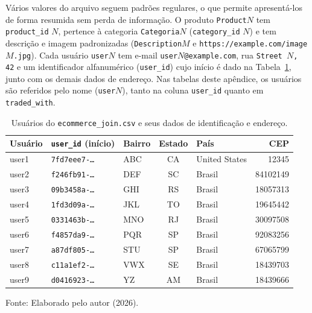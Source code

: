 Vários valores do arquivo seguem padrões regulares, o que permite apresentá-los de
forma resumida sem perda de informação. O produto \texttt{Product}$N$ tem
\texttt{product\_id} $N$, pertence à categoria \texttt{Categoria}$N$
(\texttt{category\_id} $N$) e tem descrição e imagem padronizadas
(\texttt{Description}$M$ e \texttt{https://example.com/image}$M$\texttt{.jpg}). Cada
usuário \texttt{user}$N$ tem e-mail \texttt{user}$N$\texttt{@example.com}, rua
\texttt{Street }$N$\texttt{, 42} e um identificador alfanumérico
(\texttt{user\_id}) cujo início é dado na Tabela~\ref{tab:csv-usuarios}, junto com os
demais dados de endereço. Nas tabelas deste apêndice, os usuários são referidos pelo
nome (\texttt{user}$N$), tanto na coluna \texttt{user\_id} quanto em
\texttt{traded\_with}.

\begin{table}[H]
  \caption{Usuários do \texttt{ecommerce\_join.csv} e seus dados de identificação e endereço.}
  \label{tab:csv-usuarios}
  \centering
  \begin{tabular}{l l l c l r}
    \toprule
    \textbf{Usuário} & \textbf{\texttt{user\_id} (início)} & \textbf{Bairro} & \textbf{Estado} & \textbf{País} & \textbf{CEP} \\
    \midrule
    user1 & \texttt{7fd7eee7-\ldots} & ABC & CA & United States & 12345 \\
    user2 & \texttt{f246fb91-\ldots} & DEF & SC & Brasil & 84102149 \\
    user3 & \texttt{09b3458a-\ldots} & GHI & RS & Brasil & 18057313 \\
    user4 & \texttt{1fd3d09a-\ldots} & JKL & TO & Brasil & 19645442 \\
    user5 & \texttt{0331463b-\ldots} & MNO & RJ & Brasil & 30097508 \\
    user6 & \texttt{f4857da9-\ldots} & PQR & SP & Brasil & 92083256 \\
    user7 & \texttt{a87df805-\ldots} & STU & SP & Brasil & 67065799 \\
    user8 & \texttt{c11a1ef2-\ldots} & VWX & SE & Brasil & 18439703 \\
    user9 & \texttt{d0416923-\ldots} & YZ  & AM & Brasil & 18439666 \\
    \bottomrule
  \end{tabular}
  \par\vspace{4pt}
  {\footnotesize Fonte: Elaborado pelo autor (2026).}
\end{table}


